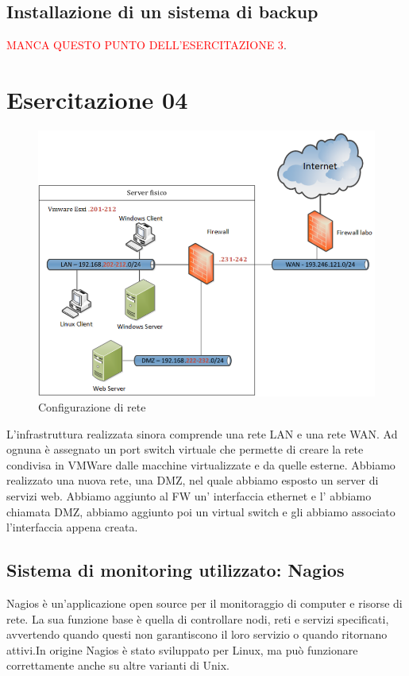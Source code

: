 \documentclass{article}
\begin{document}
\subsection{Installazione di un sistema di backup}
\textcolor{red}{MANCA QUESTO PUNTO DELL'ESERCITAZIONE 3}.
\section{Esercitazione 04}
\begin{figure}[H]
    \center
    \includegraphics[scale=0.45]{images/es4.png}
    \caption{Configurazione di rete}\label{fig:1}
\end{figure}
L’infrastruttura realizzata sinora comprende una rete LAN e una rete WAN. Ad ognuna è
assegnato un port switch virtuale che permette di creare la rete condivisa in VMWare dalle
macchine virtualizzate e da quelle esterne.
Abbiamo realizzato una nuova rete, una DMZ, nel quale abbiamo esposto un server di servizi
web. Abbiamo aggiunto al FW un' interfaccia ethernet e l' abbiamo chiamata DMZ, abbiamo aggiunto poi un virtual switch e gli abbiamo associato l'interfaccia appena creata.
\subsection{Sistema di monitoring utilizzato: Nagios}
Nagios è un'applicazione open source per il monitoraggio di computer e risorse di rete. La sua funzione base è quella di controllare nodi, reti e servizi specificati, avvertendo quando questi non garantiscono il loro servizio o quando ritornano attivi.In origine Nagios è stato sviluppato per Linux, ma può funzionare correttamente anche su altre varianti di Unix.
\end{document}
